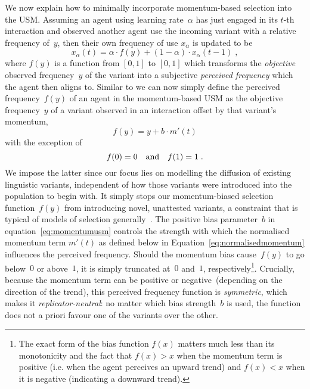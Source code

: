 \documentclass[10pt]{article}
\begin{document}
We now explain how to minimally incorporate momentum-based selection into the USM. Assuming an agent using learning rate~$\alpha$ has just engaged in its $t$-th interaction and observed another agent use the incoming variant with a relative frequency of~$y$, then their own frequency of use $x_\alpha$ is updated to be
\begin{equation}
x_\alpha(t) = \alpha\cdot f(y) + (1-\alpha)\cdot x_\alpha(t\!-\!1)\;,
\label{eq:usm}
\end{equation}
where $f(y)$ is a function from $[0,1]$ to $[0,1]$ which transforms the \emph{objective} observed frequency~$y$ of the variant into a subjective \emph{perceived frequency} which the agent then aligns to. 
Similar to \cite{Gureckis2009} we can now simply define the perceived frequency~$f(y)$ of an agent in the momentum-based USM as the objective frequency~$y$ of a variant observed in an interaction offset by that variant's momentum,
\begin{equation}
f(y) = y + b \cdot m'(t)
\label{eq:momentumusm}
\end{equation}
with the exception of
\begin{equation}
f(0)=0 \quad {\rm and} \quad f(1)=1\;.
\label{eq:momentumusmconstraint}
\end{equation}
We impose the latter since our focus lies on modelling the diffusion of existing linguistic variants, independent of how those variants were introduced into the population to begin with. It simply stops our momentum-biased selection function~$f(y)$ from introducing novel, unattested variants, a constraint that is typical of models of selection generally~\citep[see e.g.][]{Boyd1985}. The positive bias parameter~$b$ in equation~\ref{eq:momentumusm} controls the strength with which the normalised momentum term $m'(t)$ as defined below in Equation~\ref{eq:normalisedmomentum} influences the perceived frequency. Should the momentum bias cause~$f(y)$ to go below~$0$ or above~$1$, it is simply truncated at~$0$ and~$1$, respectively\footnote{The exact form of the bias function $f(x)$ matters much less than its monotonicity and the fact that $f(x)>x$ when the momentum term is positive (i.e. when the agent perceives an upward trend) and $f(x)<x$ when it is negative (indicating a downward trend).}. Crucially, because the momentum term can be positive or negative~(depending on the direction of the trend), this perceived frequency function is \emph{symmetric}, which makes it \emph{replicator-neutral}: no matter which bias strength~$b$ is used, the function does not a priori favour one of the variants over the other.
\end{document}
